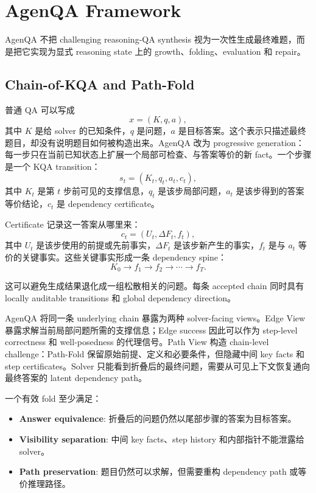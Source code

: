 \documentclass[11pt]{ctexart}
\begin{document}
\section{AgenQA Framework}

AgenQA 不把 challenging reasoning-QA synthesis 视为一次性生成最终难题，而是把它实现为显式 reasoning state 上的 growth、folding、evaluation 和 repair。

\subsection{Chain-of-KQA and Path-Fold}

普通 QA 可以写成
\[
x=(K,q,a),
\]
其中 $K$ 是给 solver 的已知条件，$q$ 是问题，$a$ 是目标答案。这个表示只描述最终题目，却没有说明题目如何被构造出来。AgenQA 改为 progressive generation：每一步只在当前已知状态上扩展一个局部可检查、与答案等价的新 fact。一个步骤是一个 KQA transition：
\[
s_t=(K_t,q_t,a_t,c_t),
\]
其中 $K_t$ 是第 $t$ 步前可见的支撑信息，$q_t$ 是该步局部问题，$a_t$ 是该步得到的答案等价结论，$c_t$ 是 dependency certificate。

Certificate 记录这一答案从哪里来：
\[
c_t=(U_t,\Delta F_t,f_t),
\]
其中 $U_t$ 是该步使用的前提或先前事实，$\Delta F_t$ 是该步新产生的事实，$f_t$ 是与 $a_t$ 等价的关键事实。这些关键事实形成一条 dependency spine：
\[
K_0 \rightarrow f_1 \rightarrow f_2 \rightarrow \cdots \rightarrow f_T.
\]

这可以避免生成结果退化成一组松散相关的问题。每条 accepted chain 同时具有 locally auditable transitions 和 global dependency direction。

AgenQA 将同一条 underlying chain 暴露为两种 solver-facing views。Edge View 暴露求解当前局部问题所需的支撑信息；Edge success 因此可以作为 step-level correctness 和 well-posedness 的代理信号。Path View 构造 chain-level challenge：Path-Fold 保留原始前提、定义和必要条件，但隐藏中间 key facts 和 step certificates。Solver 只能看到折叠后的最终问题，需要从可见上下文恢复通向最终答案的 latent dependency path。

一个有效 fold 至少满足：
\begin{itemize}
  \item \textbf{Answer equivalence}: 折叠后的问题仍然以尾部步骤的答案为目标答案。
  \item \textbf{Visibility separation}: 中间 key facts、step history 和内部指针不能泄露给 solver。
  \item \textbf{Path preservation}: 题目仍然可以求解，但需要重构 dependency path 或等价推理路径。
\end{itemize}
\end{document}
